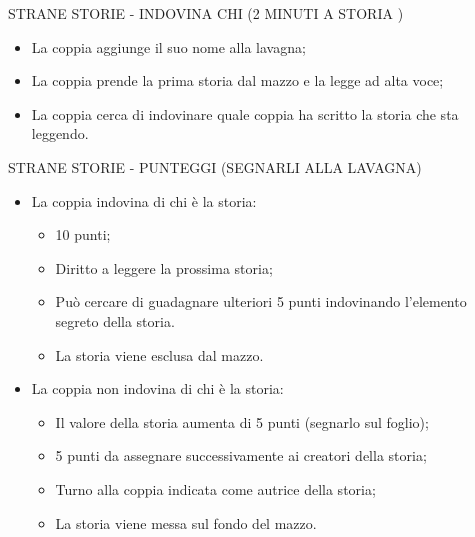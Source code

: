 \documentclass[aspectratio=1610]{beamer}
\begin{document}
\begin{frame}{STRANE STORIE - INDOVINA CHI (2 MINUTI A STORIA )}
    \begin{itemize}
        \item La coppia aggiunge il suo nome alla lavagna;
        \pause
        \item La coppia prende la prima storia dal mazzo e la legge ad alta voce;
        \pause
        \item La coppia cerca di indovinare quale coppia ha scritto la storia che sta leggendo.
    \end{itemize}
\end{frame}

\begin{frame}{STRANE STORIE - PUNTEGGI (SEGNARLI ALLA LAVAGNA)}
    \begin{itemize}
        \item La coppia indovina di chi è la storia:
        \begin{itemize}
            \item 10 punti;
            \item Diritto a leggere la prossima storia;
            \item Può cercare di guadagnare ulteriori 5 punti indovinando l'elemento segreto della storia.
            \item La storia viene esclusa dal mazzo.
        \end{itemize}
        \item La coppia non indovina di chi è la storia: 
        \begin{itemize}
            \item Il valore della storia aumenta di 5 punti (segnarlo sul foglio);
            \item 5 punti da assegnare successivamente ai creatori della storia;
            \item Turno alla coppia indicata come autrice della storia;
            \item La storia viene messa sul fondo del mazzo.
        \end{itemize}
    \end{itemize}
\end{frame}
\end{document}

